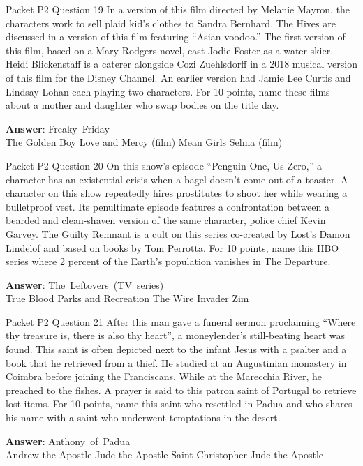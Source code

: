 \begin{frame}{Packet P2 Question 19}
In a version of this film directed by Melanie Mayron, the characters work to sell plaid kid’s clothes to Sandra Bernhard. The Hives are discussed in a version of this film featuring “Asian voodoo.” The first version of this film, based on a Mary Rodgers novel, cast Jodie Foster as a water skier. Heidi Blickenstaff is a caterer alongside Cozi Zuehlsdorff in a 2018 musical version of this film for the Disney Channel. An earlier version had Jamie Lee Curtis and Lindsay Lohan each playing two characters. For 10 points, name these films about a mother and daughter who swap bodies on the title day.        

\textbf{Answer}: Freaky\ Friday\\
 The Golden Boy
 Love and Mercy (film)
 Mean Girls
 Selma (film)
\end{frame}

\begin{frame}{Packet P2 Question 20}
On this show’s episode “Penguin One, Us Zero,” a character has an existential crisis when a bagel doesn’t come out of a toaster. A character on this show repeatedly hires prostitutes to shoot her while wearing a bulletproof vest. Its penultimate episode features a confrontation between a bearded and clean-shaven version of the same character, police chief Kevin Garvey. The Guilty Remnant is a cult on this series co-created by Lost's Damon Lindelof and based on books by Tom Perrotta. For 10 points, name this HBO series where 2 percent of the Earth's population vanishes in The Departure.        

\textbf{Answer}: The\ Leftovers\ (TV\ series)\\
 True Blood
 Parks and Recreation
 The Wire
 Invader Zim
\end{frame}

\begin{frame}{Packet P2 Question 21}
After this man gave a funeral sermon proclaiming ``Where thy treasure is, there is also thy heart'', a moneylender’s still-beating heart was found. This saint is often depicted next to the infant Jesus with a psalter and a book that he retrieved from a thief. He studied at an Augustinian monastery in Coimbra before joining the Franciscans. While at the Marecchia River, he preached to the fishes. A prayer is said to this patron saint of Portugal to retrieve lost   items. For 10 points,   name this saint who resettled in Padua and who shares his name with a saint who underwent temptations in the desert.    

\textbf{Answer}: Anthony\ of\ Padua\\
 Andrew the Apostle
 Jude the Apostle
 Saint Christopher
 Jude the Apostle
\end{frame}

